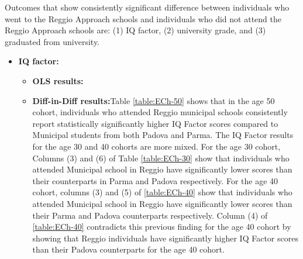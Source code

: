 \documentclass[11pt]{article}
\begin{document}
Outcomes that show consistently significant difference between individuals who went to the Reggio Approach schools and individuals who did not attend the Reggio Approach schools are: (1) IQ factor, (2) university grade, and (3) graduated from university.  
\begin{itemize}
\item \textbf{IQ factor:} 
	\begin{itemize}
	\item \textbf{OLS results:}%
	
	\item \textbf{Diff-in-Diff results:}Table \ref{table:ECh-50} shows that in the age 50 cohort, individuals who attended Reggio municipal schools consistently report statistically significantly higher IQ Factor scores compared to Municipal students from both Padova and Parma. The IQ Factor results for the age 30 and 40 cohorts are more mixed. For the age 30 cohort, Columns (3) and (6) of Table \ref{table:ECh-30} show that individuals who attended Municipal school in Reggio have significantly lower scores than their counterparts in Parma and Padova respectively. For the age 40 cohort, columns (3) and (5) of \ref{table:ECh-40} show that individuals who attended Municipal school in Reggio have significantly lower scores than their Parma and Padova counterparts respectively. Column (4) of \ref{table:ECh-40} contradicts this previous finding for the age 40 cohort by showing that Reggio individuals have significantly higher IQ Factor scores than their Padova counterparts for the age 40 cohort.
	\end{itemize}
	

\end{itemize}
\end{document}
